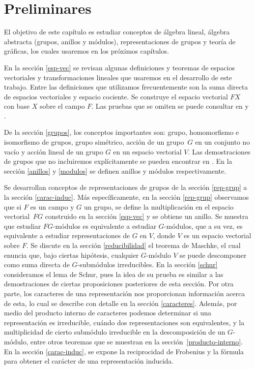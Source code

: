 \documentclass[12pt]{book}
\theoremstyle{definition}
\newcounter{in}
\newcounter{ini}
\begin{document}
\chapter{Preliminares}
\label{preliminares}

El objetivo de este capítulo es estudiar conceptos de álgebra
lineal, álgebra abstracta (grupos, anillos y módulos), representaciones
de grupos y teoría de gráficas, los cuales usaremos en los próximos capítulos. 

En la sección \ref{esp-vec} se revisan algunas definiciones y teoremas
de espacios vectoriales y transformaciones lineales que usaremos en el
desarrollo de este trabajo. Entre las definiciones que utilizamos
frecuentemente son la suma directa de espacios vectoriales y espacio
cociente. Se construye el espacio vectorial $FX$ con base $X$ sobre el
campo $F$. Las pruebas que se
omiten se puede consultar en \cite{friedberg1982algebra} y
\cite{herstein1990algebra}. 

De la sección \ref{grupos}, los conceptos importantes son: grupo, homomorfismo e isomorfismo de grupos, grupo
simétrico, acción de un grupo~$G$ en un conjunto no vacío y acción lineal
de un grupo $G$ en un espacio vectorial $V$. Las demostraciones de
grupos que no incluiremos explícitamente se pueden encontrar en
\cite{fraleigh}. En la sección \ref{anillos} y \ref{modulos} se
definen anillos y módulos respectivamente.

Se desarrollan conceptos de representaciones de grupos de la sección
\ref{rep-grup} a la sección \ref{carac-induc}. Más específicamente, en
la sección \ref{rep-grup} observamos que si $F$ es un campo y $G$ un
grupo, se define la multiplicación en el espacio vectorial~$FG$
construido en la sección \ref{esp-vec} y se obtiene un anillo. Se
muestra que estudiar
$FG$-módulos es equivalente a estudiar $G$-módulos, que a su vez, es
equivalente a estudiar representaciones de $G$ en $V$, donde $V$ es un
espacio vectorial sobre $F$. Se discute en la sección
\ref{reducibilidad} el teorema de Maschke, el cual
enuncia que, bajo ciertas hipótesis, cualquier $G$-módulo $V$ se puede descomponer como suma
directa de $G$-submódulos irreducibles. En la sección \ref{schur}
consideramos el lema de Schur, pues la idea de su prueba es similar a
las demostraciones de ciertas proposiciones posteriores de esta sección. Por otra parte, los caracteres de
una representación nos proporcionan información acerca de esta, lo
cual se describe con detalle en la sección \ref{caracteres}. Además,
por medio del producto interno de caracteres podemos determinar si una
representación es irreducible, cuándo dos representaciones son
equivalentes, y la multiplicidad de cierto submódulo irreducible en la
descomposición de un $G$-módulo, entre otros teoremas que se muestran en la
sección~\ref{producto-interno}. En la sección \ref{carac-induc}, se expone la reciprocidad de
Frobenius y la fórmula para obtener el carácter de una representación
inducida.
\end{document}
